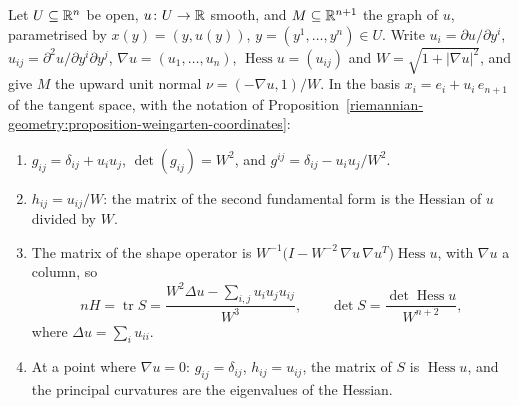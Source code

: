 \begin{proposition}\label{riemannian-geometry:proposition-graph-second-fundamental-form}
Let $U \subseteq \mathbb{R}^n$ be open, $u \colon U \to \mathbb{R}$ smooth, and $M \subseteq \mathbb{R}^{n+1}$ the graph of $u$, parametrised by $x(y) = (y, u(y))$, $y = (y^1, \ldots, y^n) \in U$. Write
$u_i = \partial u/\partial y^i$, $u_{ij} = \partial^2u/\partial y^i\partial y^j$, $\nabla u = (u_1, \ldots, u_n)$, $\operatorname{Hess}u = (u_{ij})$ and $W = \sqrt{1 + |\nabla u|^2}$, and give $M$ the upward unit
normal $\nu = (-\nabla u, 1)/W$. In the basis $x_i = e_i + u_i\,e_{n+1}$ of the tangent space, with the notation of Proposition~\ref{riemannian-geometry:proposition-weingarten-coordinates}:
\begin{enumerate}
\item $g_{ij} = \delta_{ij} + u_iu_j$, $\det(g_{ij}) = W^2$, and $g^{ij} = \delta_{ij} - u_iu_j/W^2$.
\item $h_{ij} = u_{ij}/W$: the matrix of the second fundamental form is the Hessian of $u$ divided by $W$.
\item The matrix of the shape operator is $W^{-1}\bigl(I - W^{-2}\,\nabla u\,\nabla u^T\bigr)\operatorname{Hess}u$, with $\nabla u$ a column, so
\[
nH = \operatorname{tr}S = \frac{W^2\Delta u - \sum_{i,j}u_iu_ju_{ij}}{W^3}, \qquad \det S = \frac{\det\operatorname{Hess}u}{W^{n+2}} ,
\]
where $\Delta u = \sum_iu_{ii}$.
\item At a point where $\nabla u = 0$: $g_{ij} = \delta_{ij}$, $h_{ij} = u_{ij}$, the matrix of $S$ is $\operatorname{Hess}u$, and the principal curvatures are the eigenvalues of the Hessian.
\end{enumerate}
\end{proposition}

